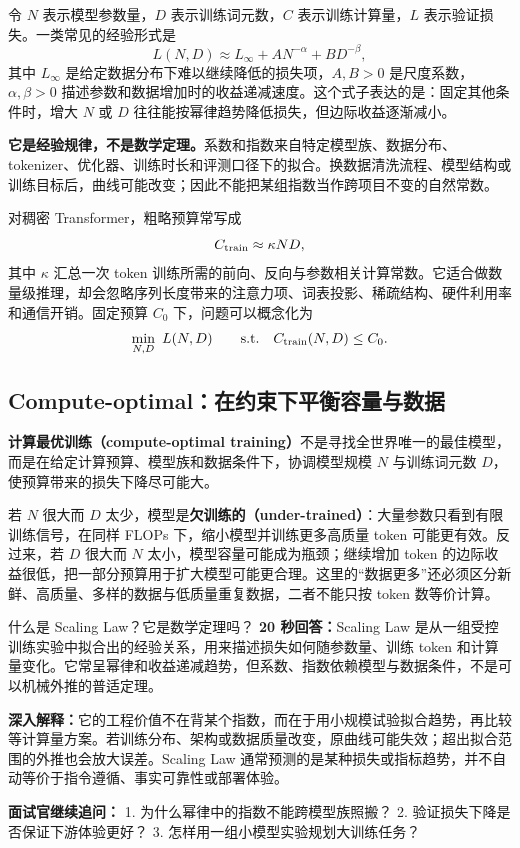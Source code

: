 令 $N$ 表示模型参数量，$D$ 表示训练词元数，$C$ 表示训练计算量，$L$ 表示验证损失。一类常见的经验形式是
\[
L(N,D)\approx L_\infty+A N^{-\alpha}+B D^{-\beta},
\]
其中 $L_\infty$ 是给定数据分布下难以继续降低的损失项，$A,B>0$ 是尺度系数，$\alpha,\beta>0$ 描述参数和数据增加时的收益递减速度。这个式子表达的是：固定其他条件时，增大 $N$ 或 $D$ 往往能按幂律趋势降低损失，但边际收益逐渐减小。

\textbf{它是经验规律，不是数学定理。}系数和指数来自特定模型族、数据分布、tokenizer、优化器、训练时长和评测口径下的拟合。换数据清洗流程、模型结构或训练目标后，曲线可能改变；因此不能把某组指数当作跨项目不变的自然常数。

对稠密 Transformer，粗略预算常写成
\[
C_{\rm train}\approx \kappa ND,
\]
其中 $\kappa$ 汇总一次 token 训练所需的前向、反向与参数相关计算常数。它适合做数量级推理，却会忽略序列长度带来的注意力项、词表投影、稀疏结构、硬件利用率和通信开销。固定预算 $C_0$ 下，问题可以概念化为
\[
\min_{N,D}\ L(N,D)
\qquad
\text{s.t.}\quad C_{\rm train}(N,D)\le C_0.
\]

\subsection{Compute-optimal：在约束下平衡容量与数据}

\textbf{计算最优训练（compute-optimal training）}不是寻找全世界唯一的最佳模型，而是在给定计算预算、模型族和数据条件下，协调模型规模 $N$ 与训练词元数 $D$，使预算带来的损失下降尽可能大。

若 $N$ 很大而 $D$ 太少，模型是\textbf{欠训练的（under-trained）}：大量参数只看到有限训练信号，在同样 FLOPs 下，缩小模型并训练更多高质量 token 可能更有效。反过来，若 $D$ 很大而 $N$ 太小，模型容量可能成为瓶颈；继续增加 token 的边际收益很低，把一部分预算用于扩大模型可能更合理。这里的“数据更多”还必须区分新鲜、高质量、多样的数据与低质量重复数据，二者不能只按 token 数等价计算。

\begin{interviewbox}{什么是 Scaling Law？它是数学定理吗？}
\textbf{20 秒回答：}Scaling Law 是从一组受控训练实验中拟合出的经验关系，用来描述损失如何随参数量、训练 token 和计算量变化。它常呈幂律和收益递减趋势，但系数、指数依赖模型与数据条件，不是可以机械外推的普适定理。

\textbf{深入解释：}它的工程价值不在背某个指数，而在于用小规模试验拟合趋势，再比较等计算量方案。若训练分布、架构或数据质量改变，原曲线可能失效；超出拟合范围的外推也会放大误差。Scaling Law 通常预测的是某种损失或指标趋势，并不自动等价于指令遵循、事实可靠性或部署体验。

\textbf{面试官继续追问：}
1. 为什么幂律中的指数不能跨模型族照搬？
2. 验证损失下降是否保证下游体验更好？
3. 怎样用一组小模型实验规划大训练任务？
\end{interviewbox}


